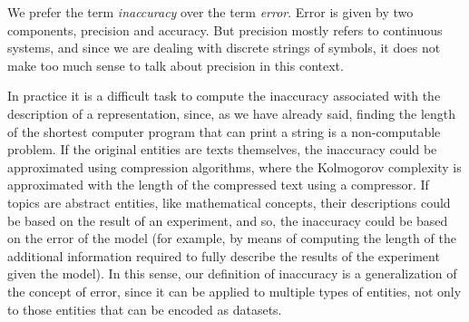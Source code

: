 We prefer the term \emph{inaccuracy} over the term \emph{error}. Error is given by two components, precision and accuracy. But precision mostly refers to continuous systems, and since we are dealing with discrete strings of symbols, it does not make too much sense to talk about precision in this context.

In practice it is a difficult task to compute the inaccuracy associated with the description of a representation, since, as we have already said, finding the length of the shortest computer program that can print a string is a non-computable problem. If the original entities are texts themselves, the inaccuracy could be approximated using compression algorithms, where the Kolmogorov complexity is approximated with the length of the compressed text using a compressor. If topics are abstract entities, like mathematical concepts, their descriptions could be based on the result of an experiment, and so, the inaccuracy could be based on the error of the model (for example, by means of computing the length of the additional information required to fully describe the results of the experiment given the model). In this sense, our definition of inaccuracy is a generalization of the concept of error, since it can be applied to multiple types of entities, not only to those entities that can be encoded as datasets.


